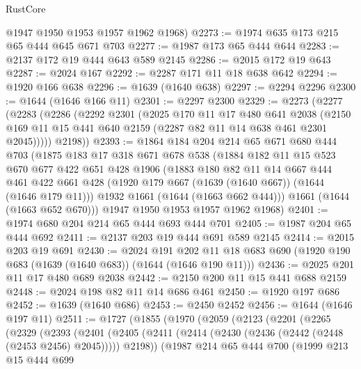 \begin{lexlean}{RustCore}
\begin{coremodule}
      @1947
      @1950
      @1953
      @1957
      @1962
      @1968)
@2273 := @1974 @635 @173 @215 @65 @444 @645 @671 @703
@2277 := @1987 @173 @65 @444 @644
@2283 := @2137 @172 @19 @444 @643 @589 @2145
@2286 := @2015 @172 @19 @643
@2287 := @2024 @167
@2292 := @2287 @171 @11 @18 @638 @642
@2294 := @1920 @166 @638
@2296 := @1639 (@1640 @638)
@2297 := @2294 @2296
@2300 := @1644 (@1646 @166 @11)
@2301 := @2297 @2300
@2329 := @2273
    (@2277
      (@2283
        (@2286
          (@2292
            @2301
            (@2025
              @170
              @11
              @17
              @480
              @641
              @2038
              (@2150 @169 @11 @15 @441 @640 @2159 (@2287 @82 @11 @14 @638 @461 @2301 @2045)))))
        @2198))
@2393 := @1864
    @184
    @204
    @214
    @65
    @671
    @680
    @444
    @703
    (@1875
      @183
      @17
      @318
      @671
      @678
      @538
      (@1884
        @182
        @11
        @15
        @523
        @670
        @677
        @422
        @651
        @428
        @1906
        (@1883
          @180
          @82
          @11
          @14
          @667
          @444
          @461
          @422
          @661
          @428
          (@1920 @179 @667 (@1639 (@1640 @667)) (@1644 (@1646 @179 @11)))
          @1932
          @1661
          (@1644 (@1663 @662 @444)))
        @1661
        (@1644 (@1663 @652 @670)))
      @1947
      @1950
      @1953
      @1957
      @1962
      @1968)
@2401 := @1974 @680 @204 @214 @65 @444 @693 @444 @701
@2405 := @1987 @204 @65 @444 @692
@2411 := @2137 @203 @19 @444 @691 @589 @2145
@2414 := @2015 @203 @19 @691
@2430 := @2024
    @191
    @202
    @11
    @18
    @683
    @690
    (@1920 @190 @683 (@1639 (@1640 @683)) (@1644 (@1646 @190 @11)))
@2436 := @2025 @201 @11 @17 @480 @689 @2038
@2442 := @2150 @200 @11 @15 @441 @688 @2159
@2448 := @2024 @198 @82 @11 @14 @686 @461
@2450 := @1920 @197 @686
@2452 := @1639 (@1640 @686)
@2453 := @2450 @2452
@2456 := @1644 (@1646 @197 @11)
@2511 := @1727
    (@1855
      (@1970
        (@2059
          (@2123
            (@2201
              (@2265
                (@2329
                  (@2393
                    (@2401
                      (@2405
                        (@2411 (@2414 (@2430 (@2436 (@2442 (@2448 (@2453 @2456) @2045))))) @2198))
                      (@1987
                        @214
                        @65
                        @444
                        @700
                        (@1999
                          @213
                          @15
                          @444
                          @699

\end{coremodule}
\end{lexlean}
